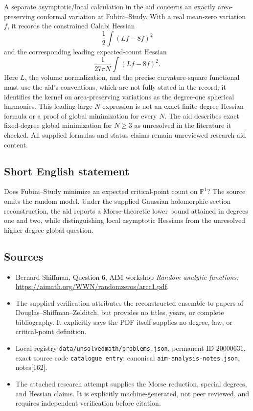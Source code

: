 \documentclass[11pt]{article}
\newcommand{\PP}{\mathbb{P}}
\begin{document}
A separate asymptotic/local calculation in the aid concerns an exactly area-preserving conformal variation at Fubini--Study. With a real mean-zero variation \(f\), it records the constrained Calabi Hessian
\[
\frac12\int (Lf-8f)^2
\]
and the corresponding leading expected-count Hessian
\[
\frac1{27\pi N}\int (Lf-8f)^2.
\]
Here \(L\), the volume normalization, and the precise curvature-square functional must use the aid's conventions, which are not fully stated in the record; it identifies the kernel on area-preserving variations as the degree-one spherical harmonics. This leading large-\(N\) expression is not an exact finite-degree Hessian formula or a proof of global minimization for every \(N\). The aid describes exact fixed-degree global minimization for \(N\geq3\) as unresolved in the literature it checked. All supplied formulas and status claims remain unreviewed research-aid content.
\subsection{Short English statement}
Does Fubini--Study minimize an expected critical-point count on \(\PP^1\)? The source omits the random model. Under the supplied Gaussian holomorphic-section reconstruction, the aid reports a Morse-theoretic lower bound attained in degrees one and two, while distinguishing local asymptotic Hessians from the unresolved higher-degree global question.
\subsection{Sources}
\begin{itemize}
\item Bernard Shiffman, Question 6, AIM workshop \emph{Random analytic functions}: \url{https://aimath.org/WWN/randomzeros/arcc1.pdf}.
\item The supplied verification attributes the reconstructed ensemble to papers of Douglas--Shiffman--Zelditch, but provides no titles, years, or complete bibliography. It explicitly says the PDF itself supplies no degree, law, or critical-point definition.
\item Local registry \texttt{data/unsolvedmath/problems.json}, permanent ID \(20000631\), exact source code \texttt{catalogue entry}; canonical \texttt{aim-analysis-notes.json}, notes[162].
\item The attached research attempt supplies the Morse reduction, special degrees, and Hessian claims. It is explicitly machine-generated, not peer reviewed, and requires independent verification before citation.
\end{itemize}
\end{document}
